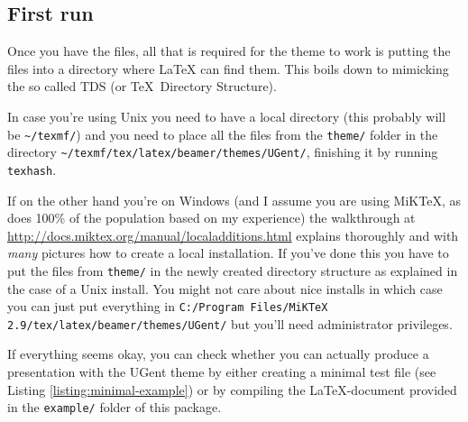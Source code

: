 \documentclass[a4paper,10pt]{article}
\begin{document}
\subsection{First run}
Once you have the files, all that is required for the theme to work is putting the files into a directory where \LaTeX{} can find them. This boils down to mimicking the so called TDS (or \TeX\ Directory Structure).

In case you're using Unix you need to have a local directory (this probably will be \verb|~/texmf/|) and you need to place all the files from the \verb|theme/| folder in the directory \verb|~/texmf/tex/latex/beamer/themes/UGent/|, finishing it by running \verb|texhash|.

If on the other hand you're on Windows (and I assume you are using MiK\TeX, as does 100\% of the population based on my experience) the walkthrough at \url{http://docs.miktex.org/manual/localadditions.html} explains thoroughly and with \emph{many} pictures how to create a local installation. If you've done this you have to put the files from \verb|theme/| in the newly created directory structure as explained in the case of a Unix install. You might not care about nice installs in which case you can just put everything in \verb|C:/Program Files/MiKTeX 2.9/tex/latex/beamer/themes/UGent/| but you'll need administrator privileges.

If everything seems okay, you can check whether you can actually produce a presentation with the UGent theme by either creating a minimal test file (see Listing \ref{listing:minimal-example}) or by compiling the \LaTeX-document provided in the \lstinline!example/! folder of this package. 
\end{document}

